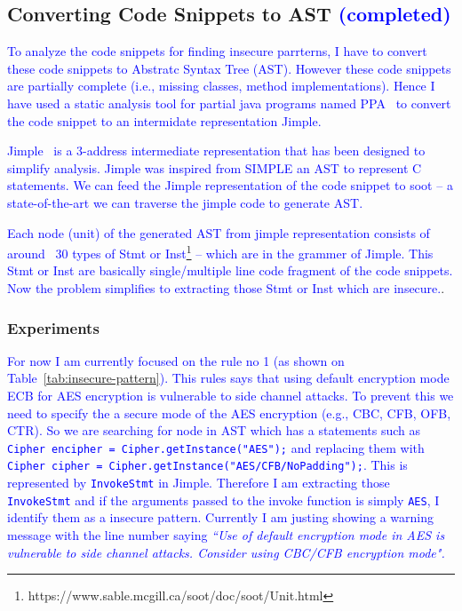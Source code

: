 \documentclass[sigconf]{acmart}
\begin{document}
\subsection{Converting Code Snippets to AST \textcolor{blue}{(completed)}}
\textcolor{blue}{
To analyze the code snippets for finding insecure parrterns, I have to convert these code snippets to Abstratc Syntax Tree (AST). However these code snippets are partially complete (i.e., missing classes, method implementations). Hence I have used a static analysis tool for partial java programs named PPA~\cite{dagenais2008enabling} to convert the code snippet to an intermidate representation Jimple.}

\textcolor{blue}{
Jimple~\cite{vallee1998jimple} is a 3-address intermediate representation that has been designed to simplify analysis. Jimple was inspired from SIMPLE an AST to represent C statements. 
We can feed the Jimple representation of the code snippet to soot -- a state-of-the-art we can traverse the jimple code to generate AST. 
}

\textcolor{blue}{
Each node (unit) of the generated AST from jimple representation consists of  around ~30 types of Stmt or Inst\footnote{https://www.sable.mcgill.ca/soot/doc/soot/Unit.html} -- which are in the grammer of Jimple. This Stmt or Inst are basically single/multiple line code fragment of the code snippets. Now the problem simplifies to extracting those Stmt or Inst which are insecure.}.

\subsubsection{Experiments}

\textcolor{blue}{For now I am currently focused on the rule no 1 (as shown on Table~\ref{tab:insecure-pattern}). This rules says that using default encryption mode ECB for AES encryption is vulnerable to side channel attacks. To prevent this we need to specify the a secure mode of the AES encryption (e.g., CBC, CFB, OFB, CTR). So we are searching for node in AST which has a statements such as \texttt{Cipher encipher = Cipher.getInstance("AES");} and replacing them with \texttt{Cipher cipher = Cipher.getInstance("AES/CFB/NoPadding");}. This is represented by \texttt{InvokeStmt} in Jimple. Therefore I am extracting those \texttt{InvokeStmt} and if the arguments passed to the invoke function is simply \texttt{AES}, I identify them as a insecure pattern. Currently I am justing showing a warning message with the line number saying 
\textit{``Use of default encryption mode in AES is vulnerable to side channel attacks. Consider using CBC/CFB encryption mode".}}
\end{document}
